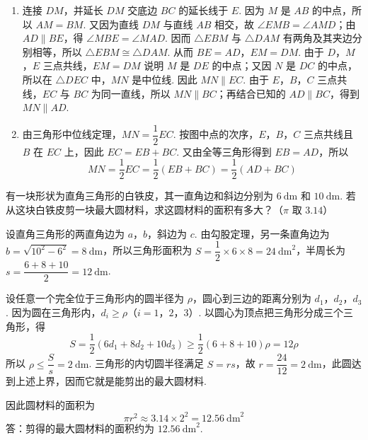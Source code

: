 \begin{solution}
\begin{enumerate}
\item 连接 \(DM\)，并延长 \(DM\) 交底边 \(BC\) 的延长线于 \(E\). 因为 \(M\) 是 \(AB\) 的中点，所以 \(AM=BM\). 又因为直线 \(DM\) 与直线 \(AB\) 相交，故 \(\angle EMB=\angle AMD\)；由 \(AD\parallel BE\)，得 \(\angle MBE=\angle MAD\). 因而 \(\triangle EBM\) 与 \(\triangle DAM\) 有两角及其夹边分别相等，所以 \(\triangle EBM\cong\triangle DAM\). 从而 \(BE=AD\)，\(EM=DM\). 由于 \(D\)，\(M\)，\(E\) 三点共线，\(EM=DM\) 说明 \(M\) 是 \(DE\) 的中点；又因 \(N\) 是 \(DC\) 的中点，所以在 \(\triangle DEC\) 中，\(MN\) 是中位线. 因此 \(MN\parallel EC\). 由于 \(E\)，\(B\)，\(C\) 三点共线，\(EC\) 与 \(BC\) 为同一直线，所以 \(MN\parallel BC\)；再结合已知的 \(AD\parallel BC\)，得到 \(MN\parallel AD\).

\item 由三角形中位线定理，\(MN=\dfrac{1}{2}EC\). 按图中点的次序，\(E\)，\(B\)，\(C\) 三点共线且 \(B\) 在 \(EC\) 上，因此 \(EC=EB+BC\). 又由全等三角形得到 \(EB=AD\)，所以
\[
MN=\frac{1}{2}EC=\frac{1}{2}(EB+BC)=\frac{1}{2}(AD+BC)
\]
\end{enumerate}
\end{solution}

\begin{problem}
有一块形状为直角三角形的白铁皮，其一直角边和斜边分别为 \(6\mathrm{~dm}\) 和 \(10\mathrm{~dm}\). 若从这块白铁皮剪一块最大圆材料，求这圆材料的面积有多大？（\(\pi\) 取 \(3.14\)）
\end{problem}

\begin{solution}
设直角三角形的两直角边为 \(a\)，\(b\)，斜边为 \(c\). 由勾股定理，另一条直角边为 \(b=\sqrt{10^2-6^2}=8\mathrm{~dm}\)，所以三角形面积为 \(S=\dfrac{1}{2}\times6\times8=24\mathrm{~dm}^2\)，半周长为 \(s=\dfrac{6+8+10}{2}=12\mathrm{~dm}\).

设任意一个完全位于三角形内的圆半径为 \(\rho\)，圆心到三边的距离分别为 \(d_1\)，\(d_2\)，\(d_3\). 因为圆在三角形内，\(d_i\ge\rho\)（\(i=1\)，\(2\)，\(3\)）. 以圆心为顶点把三角形分成三个三角形，得
\[
S=\frac{1}{2}(6d_1+8d_2+10d_3)\ge\frac{1}{2}(6+8+10)\rho=12\rho
\]
所以 \(\rho\le\dfrac{S}{s}=2\mathrm{~dm}\). 三角形的内切圆半径满足 \(S=rs\)，故 \(r=\dfrac{24}{12}=2\mathrm{~dm}\)，此圆达到上述上界，因而它就是能剪出的最大圆材料.

因此圆材料的面积为
\[
\pi r^2\approx3.14\times2^2=12.56\mathrm{~dm}^2
\]
答：剪得的最大圆材料的面积约为 \(12.56\mathrm{~dm}^2\).
\end{solution}

